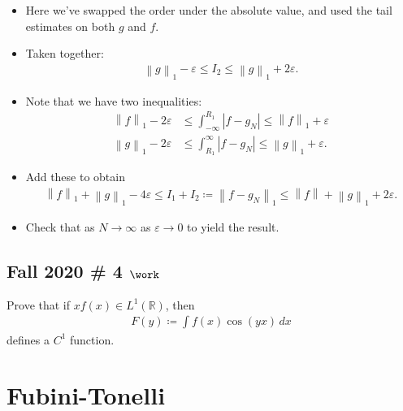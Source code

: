 \begin{solution}
\begin{itemize}
\item
  Here we've swapped the order under the absolute value, and used the
  tail estimates on both \(g\) and \(f\).
\item
  Taken together:
  \begin{align*}
  {\left\lVert {g} \right\rVert}_1 - {\varepsilon}\leq I_2 \leq {\left\lVert {g} \right\rVert}_1 + 2{\varepsilon}
  .\end{align*}
\item
  Note that we have two inequalities:
  \begin{align*}
  {\left\lVert {f} \right\rVert}_1 - 2{\varepsilon}&\leq \int_{-\infty}^{R_1} {\left\lvert {f -g_N} \right\rvert} \leq {\left\lVert {f} \right\rVert}_1 + {\varepsilon}\\
  {\left\lVert {g} \right\rVert}_1 - 2{\varepsilon}&\leq \int^{\infty}_{R_1} {\left\lvert {f -g_N} \right\rvert} \leq {\left\lVert {g} \right\rVert}_1 + {\varepsilon}
  .\end{align*}
\item
  Add these to obtain
  \begin{align*}
  {\left\lVert {f} \right\rVert}_1 + {\left\lVert {g} \right\rVert}_1 - 4{\varepsilon}\leq I_1 + I_2 \coloneqq{\left\lVert {f - g_N} \right\rVert}_1 \leq {\left\lVert {f} \right\rVert} + {\left\lVert {g} \right\rVert}_1 + 2{\varepsilon}
  .\end{align*}
\item
  Check that as \(N\to \infty\) as \({\varepsilon}\to 0\) to yield the
  result.
\end{itemize}

\end{solution}

\hypertarget{fall-2020-4-work}{%
\subsection{\texorpdfstring{Fall 2020 \# 4
\(\work\)}{Fall 2020 \# 4 \textbackslash work}}\label{fall-2020-4-work}}

Prove that if \(xf(x) \in L^1({\mathbb{R}})\), then
\begin{align*}  
F(y) \coloneqq\int f(x) \cos(yx)\,  dx
\end{align*}
defines a \(C^1\) function.

\hypertarget{fubini-tonelli}{%
\section{Fubini-Tonelli}\label{fubini-tonelli}}

